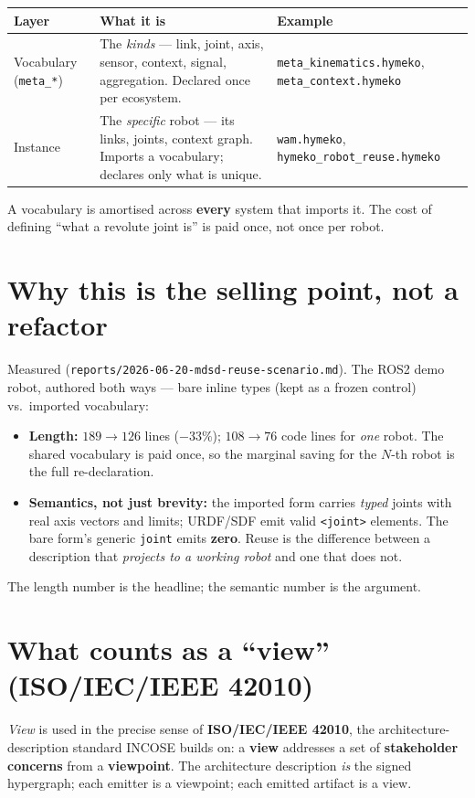 \documentclass[11pt]{article}
\newcommand{\code}[1]{\texttt{\small #1}}
\begin{document}
\begin{center}\small
\begin{tabular}{@{}p{2.6cm}p{7.2cm}p{4.4cm}@{}}
\toprule
\textbf{Layer} & \textbf{What it is} & \textbf{Example} \\
\midrule
Vocabulary (\code{meta\_*}) & The \emph{kinds} --- link, joint, axis, sensor, context, signal,
  aggregation. Declared once per ecosystem. & \code{meta\_kinematics.hymeko}, \code{meta\_context.hymeko} \\
\addlinespace
Instance & The \emph{specific} robot --- its links, joints, context graph. Imports a vocabulary;
  declares only what is unique. & \code{wam.hymeko}, \code{hymeko\_robot\_reuse.hymeko} \\
\bottomrule
\end{tabular}
\end{center}

A vocabulary is amortised across \textbf{every} system that imports it. The cost of defining ``what a
revolute joint is'' is paid once, not once per robot.

\section{Why this is the selling point, not a refactor}
Measured (\code{reports/2026-06-20-mdsd-reuse-scenario.md}). The ROS2 demo robot, authored both
ways --- bare inline types (kept as a frozen control) vs.\ imported vocabulary:
\begin{itemize}[nosep]
  \item \textbf{Length:} $189\to126$ lines ($-33\%$); $108\to76$ code lines for \emph{one} robot.
        The shared vocabulary is paid once, so the marginal saving for the $N$-th robot is the full
        re-declaration.
  \item \textbf{Semantics, not just brevity:} the imported form carries \emph{typed} joints with
        real axis vectors and limits; URDF/SDF emit valid \code{<joint>} elements. The bare form's
        generic \code{joint} emits \textbf{zero}. Reuse is the difference between a description that
        \emph{projects to a working robot} and one that does not.
\end{itemize}
The length number is the headline; the semantic number is the argument.

\section{What counts as a ``view'' (ISO/IEC/IEEE 42010)}
\emph{View} is used in the precise sense of \textbf{ISO/IEC/IEEE 42010}, the architecture-description
standard INCOSE builds on: a \textbf{view} addresses a set of \textbf{stakeholder concerns} from a
\textbf{viewpoint}. The architecture description \emph{is} the signed hypergraph; each emitter is a
viewpoint; each emitted artifact is a view.
\end{document}
